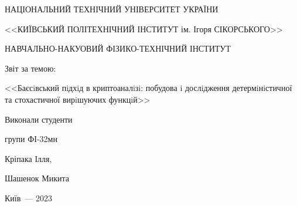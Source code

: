 
	\thispagestyle{empty}
	
	\begin{center}
		НАЦІОНАЛЬНИЙ ТЕХНІЧНИЙ УНІВЕРСИТЕТ УКРАЇНИ \par
		<<КИЇВСЬКИЙ ПОЛІТЕХНІЧНИЙ ІНСТИТУТ ім. Ігоря СІКОРСЬКОГО>>\par
		НАВЧАЛЬНО-НАКУОВИЙ ФІЗИКО-ТЕХНІЧНИЙ ІНСТИТУТ\par
		
		\vspace{60mm}
		{\huge Звіт за темою:\par
			\LARGE <<Баєсiвський пiдхiд в криптоаналiзi: побудова i
		дослiдження детермiнiстичної та стохастичної
		вирiшуючих функцiй>>\par}
		
	\end{center}
	
	\vspace{40mm}
	\begin{flushright}
		Виконали студенти
		
		групи ФІ-32мн
		
		Кріпака Ілля,

		Шашенок Микита
		
	\end{flushright}
	
	\vspace{27mm}
	\begin{center}
		{Київ~--- 2023}
	\end{center}
	